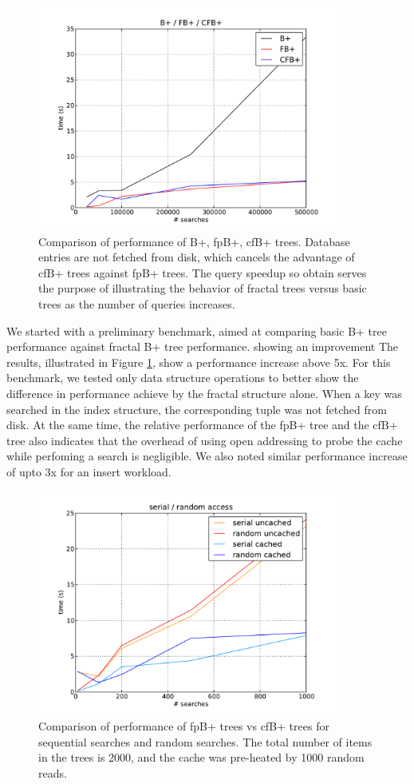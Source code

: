 \documentclass{article}
\begin{document}
\begin{figure}[h]
\begin{center}
\includegraphics[width=280pt]{base}
\end{center}
\caption{
Comparison of performance of B+, fpB+, cfB+ trees.
Database entries are not fetched from disk, which cancels the
advantage of cfB+ trees against fpB+ trees.
The query speedup so obtain serves the purpose
of illustrating the behavior of fractal trees versus basic trees as the number
of queries increases.}
\label{fig:base}
\end{figure}

We started with a preliminary benchmark, aimed at comparing basic B+ tree
performance against fractal B+ tree performance. showing an improvement
The results, illustrated in Figure \ref{fig:base}, show a performance increase
above 5x.
For this benchmark, we tested only data structure operations to better show the
difference in performance
achieve by the fractal structure alone. When a key was searched in the index structure, the
corresponding tuple was not fetched from disk. At the same time, the relative performance of the
fpB+ tree and the cfB+ tree also indicates that the overhead of using open addressing to probe the cache
while perfoming a search is negligible. We also noted similar performance increase of upto 3x for 
an insert workload.

\begin{figure}[H]
\begin{center}
\includegraphics[width=280pt]{combs}
\end{center}
\caption{
Comparison of performance of fpB+ trees vs cfB+ trees for sequential searches
and random searches.
The total number of items in the trees is 2000, and the cache was pre-heated by
1000 random reads.
}
\label{fig:combs}
\end{figure}
\end{document}
